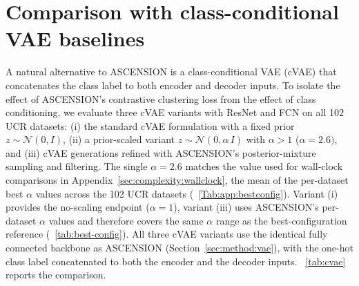 \section{Comparison with class-conditional VAE baselines}
\label{app:cvae_baseline}
\label{sec:results:cvae}

A natural alternative to ASCENSION is a class-conditional VAE
(cVAE) that concatenates the class label to both encoder and
decoder inputs. To isolate the effect of ASCENSION's
contrastive clustering loss from the effect of class
conditioning, we evaluate three cVAE variants with ResNet and FCN on all 102 UCR
datasets: (i) the standard cVAE formulation with a fixed prior
$z \sim \mathcal{N}(0, I)$, (ii) a prior-scaled variant
$z \sim \mathcal{N}(0, \alpha\,I)$ with $\alpha > 1$ ($\alpha = 2.6)$, and (iii) cVAE generations refined with
ASCENSION's posterior-mixture sampling and filtering.
The single $\alpha = 2.6$ matches the value used for wall-clock
comparisons in Appendix~\ref{sec:complexity:wallclock}, the mean
of the per-dataset best $\alpha$ values across the 102 UCR datasets
(\tablename~\ref{Tab:app:bestconfig}).
Variant (i) provides the no-scaling endpoint ($\alpha = 1$), variant
(iii) uses ASCENSION's per-dataset $\alpha$ values and therefore
covers the same $\alpha$ range as the best-configuration reference
(\tablename~\ref{tab:best-config}).
All three cVAE variants use the identical fully connected backbone as
ASCENSION (Section~\ref{sec:method:vae}), with the one-hot class label
concatenated to both the encoder and the decoder inputs.
\tablename~\ref{tab:cvae} reports the comparison.

